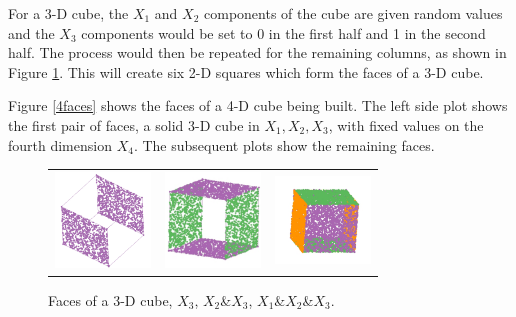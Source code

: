 \documentclass[article]{jss}
\begin{document}
For a 3-D cube, the $X_1$ and $X_2$ components of the cube are given
random values and the $X_3$ components would be set to 0 in the first
half and 1 in the second half. The process would then be repeated for
the remaining columns, as shown in Figure \ref{faces}. This will
create six 2-D squares which form the faces of a 3-D cube.

Figure \ref{4faces} shows the faces of a 4-D cube being built. The
left side plot shows the first pair of faces, a solid 3-D cube in
$X_1, X_2, X_3$, with fixed values on the fourth dimension $X_4$. The
subsequent plots show the remaining faces.

\begin{figure}[ht]
  \centering
  \begin{tabular}{c c c}
    \includegraphics[width=1in]{cube-x.pdf} &
    \includegraphics[width=1in]{cube-x-y.pdf} &
    \includegraphics[width=1in]{cube-x-y-z.pdf} 
  \end{tabular}

  \caption{Faces of a 3-D cube, $X_3$, $X_2$\&$X_3$,
      $X_1$\&$X_2$\&$X_3$.}
  \label{faces}
\end{figure}
\end{document}
